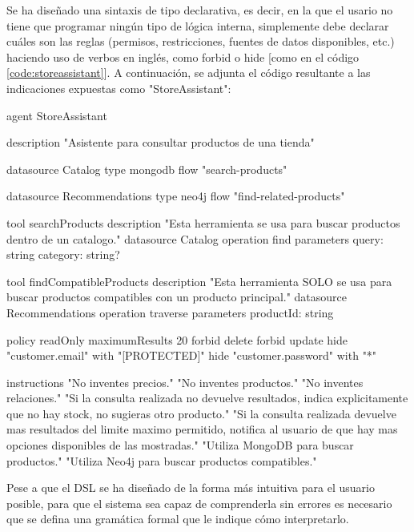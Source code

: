 \documentclass[12pt,twoside,titlepage]{report}
\begin{document}
Se ha diseñado una sintaxis de tipo declarativa, es decir, en la que el usario no tiene que programar ningún tipo de lógica interna, simplemente debe declarar cuáles son las reglas (permisos, restricciones, fuentes de datos disponibles, etc.) haciendo uso de verbos en inglés, como forbid o hide [como en el código \ref{code:storeassistant}]. A continuación, se adjunta el código resultante a las indicaciones expuestas como "StoreAssistant":

\begin{mypython}[basicstyle=\footnotesize,caption={Propuesta de sintaxis para el DSL de StoreAssistant (visión del usuario).}, label={code:storeassistant}] 
  agent StoreAssistant {
    
    description "Asistente para consultar productos de una tienda"

    datasource Catalog {
        type mongodb
        flow "search-products"
    }

    datasource Recommendations {
        type neo4j
        flow "find-related-products"
    }

    tool searchProducts {
        description "Esta herramienta se usa para buscar productos dentro de un catalogo."
        datasource Catalog
        operation find
        parameters {
            query: string
            category: string?
        }
    }

    tool findCompatibleProducts {
        description "Esta herramienta SOLO se usa para buscar productos compatibles con un producto principal."
        datasource Recommendations
        operation traverse
        parameters {
            productId: string
        }
    }

    policy {
        readOnly
        maximumResults 20
        forbid delete
        forbid update
        hide "customer.email" with "[PROTECTED]"
        hide "customer.password" with "*"
    }

    instructions {
        "No inventes precios."
        "No inventes productos."
        "No inventes relaciones."
        "Si la consulta realizada no devuelve resultados, indica explicitamente que no hay stock, no sugieras otro producto."
        "Si la consulta realizada devuelve mas resultados del limite maximo permitido, notifica al usuario de que hay mas opciones disponibles de las mostradas."
        "Utiliza MongoDB para buscar productos."
        "Utiliza Neo4j para buscar productos compatibles."
    }
  }
\end{mypython}

Pese a que el DSL se ha diseñado de la forma más intuitiva para el usuario posible, para que el sistema sea capaz de comprenderla sin errores es necesario que se defina una gramática formal que le indique cómo interpretarlo. 
\end{document}
